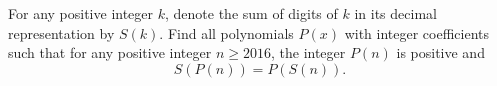 For any positive integer $k$, denote the sum of digits of $k$ in its decimal representation by $S\left(k\right)$. Find all polynomials $P\left(x\right)$ with integer coefficients such that for any positive integer $n\geq 2016$, the integer $P\left(n\right)$ is positive and \[S\left(P\left(n\right)\right)=P\left(S\left(n\right)\right).\]
